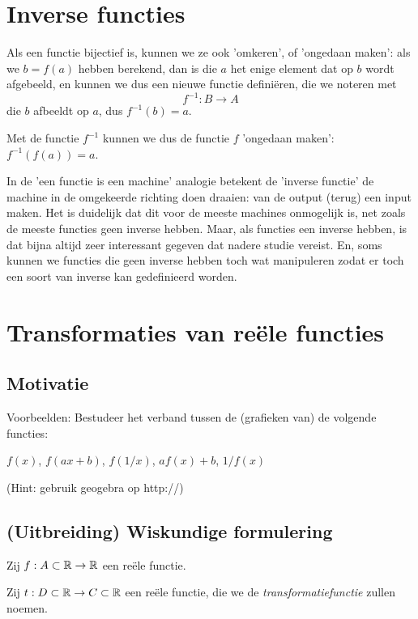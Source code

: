 \documentclass{ximera}
\begin{document}
\section{Inverse functies}

Als een functie bijectief is, kunnen we ze ook 'omkeren', of 'ongedaan maken': als we $b=f(a)$ hebben berekend, dan is die $a$ het enige element dat op $b$ wordt afgebeeld, en kunnen we dus een nieuwe functie definiëren, die we noteren met 
$$f^{-1}: B \rightarrow A$$ 
die $b$ afbeeldt op $a$, dus $f^{-1}(b) = a$.

Met de functie $f^{-1}$ kunnen we dus de functie $f$ 'ongedaan maken': $f^{-1}(f(a)) = a$.

In de 'een functie is een machine' analogie betekent de 'inverse functie' de machine in de omgekeerde richting doen draaien: van de output (terug) een input maken. Het is duidelijk dat dit voor de meeste machines onmogelijk is, net zoals de meeste functies geen inverse hebben. Maar, als functies een inverse hebben, is dat bijna altijd zeer interessant gegeven dat nadere studie vereist. En, soms kunnen we functies die geen inverse hebben toch wat manipuleren zodat er toch een soort van inverse kan gedefinieerd worden.

\section{Transformaties van reële functies}

\subsection{Motivatie}

Voorbeelden: Bestudeer het verband tussen de (grafieken van) de volgende functies: 

$f(x)$, $f(ax+b)$, $f(1/x)$, $af(x)+b$, $1/f(x)$


(Hint: gebruik geogebra op http://)

\subsection{(Uitbreiding) Wiskundige formulering}

Zij $f:A\subset\mathbb{R}\to \mathbb{R}$ een reële functie.

Zij $t:D \subset\mathbb{R} \to C\subset\mathbb{R}$ een reële functie, die we de \textit{transformatiefunctie} zullen noemen.
\end{document}
